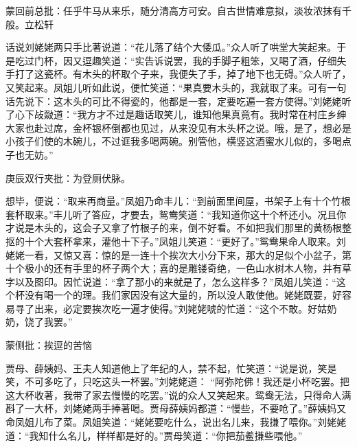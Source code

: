 
\begin{parag}
    \begin{note}蒙回前总批：任乎牛马从来乐，随分清高方可安。自古世情难意拟，淡妆浓抹有千般。立松轩\end{note}
\end{parag}


\begin{parag}
    话说刘姥姥两只手比著说道：“花儿落了结个大倭瓜。”众人听了哄堂大笑起来。于是吃过门杯，因又逗趣笑道：“实告诉说罢，我的手脚子粗笨，又喝了酒，仔细失手打了这瓷杯。有木头的杯取个子来，我便失了手，掉了地下也无碍。”众人听了，又笑起来。凤姐儿听如此说，便忙笑道：“果真要木头的，我就取了来。可有一句话先说下：这木头的可比不得瓷的，他都是一套，定要吃遍一套方使得。”刘姥姥听了心下敁敠道：“我方才不过是趣话取笑儿，谁知他果真竟有。我时常在村庄乡绅大家也赴过席，金杯银杯倒都也见过，从来没见有木头杯之说。哦，是了，想必是小孩子们使的木碗儿，不过诓我多喝两碗。别管他，横竖这酒蜜水儿似的，多喝点子也无妨。”\begin{note}庚辰双行夹批：为登厕伏脉。\end{note}想毕，便说：“取来再商量。”凤姐乃命丰儿：“到前面里间屋，书架子上有十个竹根套杯取来。”丰儿听了答应，才要去，鸳鸯笑道：“我知道你这十个杯还小。况且你才说是木头的，这会子又拿了竹根子的来，倒不好看。不如把我们那里的黄杨根整抠的十个大套杯拿来，灌他十下子。”凤姐儿笑道：“更好了。”鸳鸯果命人取来。刘姥姥一看，又惊又喜：惊的是一连十个挨次大小分下来，那大的足似个小盆子，第十个极小的还有手里的杯子两个大；喜的是雕镂奇绝，一色山水树木人物，并有草字以及图印。因忙说道：“拿了那小的来就是了，怎么这样多？”凤姐儿笑道：“这个杯没有喝一个的理。我们家因没有这大量的，所以没人敢使他。姥姥既要，好容易寻了出来，必定要挨次吃一遍才使得。”刘姥姥唬的忙道：“这个不敢。好姑奶奶，饶了我罢。”\begin{note}蒙侧批：挨逗的苦恼\end{note}贾母、薛姨妈、王夫人知道他上了年纪的人，禁不起，忙笑道：“说是说，笑是笑，不可多吃了，只吃这头一杯罢。”刘姥姥道： “阿弥陀佛！我还是小杯吃罢。把这大杯收著，我带了家去慢慢的吃罢。”说的众人又笑起来。鸳鸯无法，只得命人满斟了一大杯，刘姥姥两手捧著喝。贾母薛姨妈都道：“慢些，不要呛了。”薛姨妈又命凤姐儿布了菜。凤姐笑道：“姥姥要吃什么，说出名儿来，我搛了喂你。”刘姥姥道：“我知什么名儿，样样都是好的。”贾母笑道：“你把茄鲝搛些喂他。” 
\end{parag}
